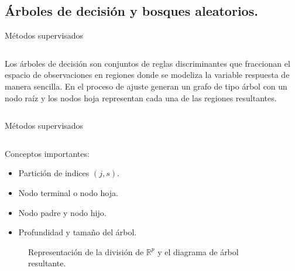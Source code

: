\subsection{Árboles de decisión y bosques aleatorios.}
\begin{frame}{Métodos supervisados}
\begin{columns}
\begin{column}{0.9\textwidth}
\begin{defi}
Los árboles de decisión son conjuntos de reglas discriminantes que fraccionan el espacio de observaciones en regiones donde se modeliza la variable respuesta de manera sencilla. En el proceso de ajuste generan un grafo de tipo árbol con un nodo raíz y los nodos hoja representan cada una de las regiones resultantes. 
\end{defi}
\end{column}
\end{columns}
\end{frame}

\begin{frame}{Métodos supervisados}
\begin{columns}
\begin{column}{0.9\textwidth}
Conceptos importantes:
\begin{itemize}
\item Partición de indices $(j,s)$.
\item Nodo terminal o nodo hoja.
\item Nodo padre y nodo hijo.
\item Profundidad y tamaño del árbol.
\end{itemize}
\begin{center}
\begin{figure}[ht]
 \caption{Representación de la división de $\mathbb{R}^p$ y el diagrama de árbol \\resultante.}
 \label{f:MARC1}
\end{figure}
\end{center}
\end{column}
\end{columns}
\end{frame}

